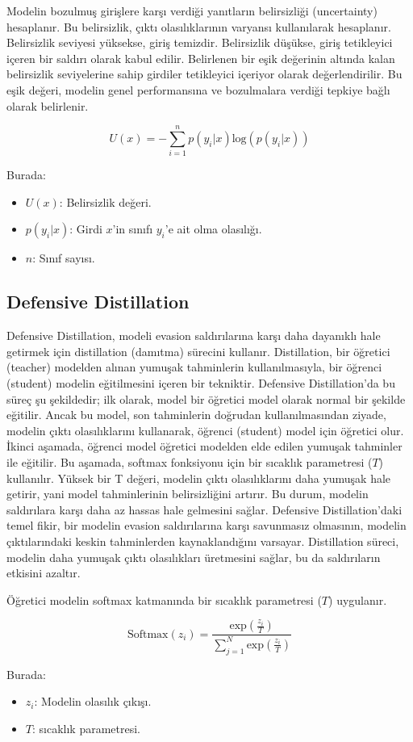 Modelin bozulmuş girişlere karşı verdiği yanıtların belirsizliği (uncertainty) hesaplanır. Bu belirsizlik, çıktı olasılıklarının varyansı kullanılarak hesaplanır. Belirsizlik seviyesi yüksekse, giriş temizdir. Belirsizlik düşükse, giriş tetikleyici içeren bir saldırı olarak kabul edilir. Belirlenen bir eşik değerinin altında kalan belirsizlik seviyelerine sahip girdiler tetikleyici içeriyor olarak değerlendirilir. Bu eşik değeri, modelin genel performansına ve bozulmalara verdiği tepkiye bağlı olarak belirlenir.

\[ U(x) = - \sum_{i=1}^{n} p(y_i | x) \text{log}(p(y_i | x)) \]

Burada:

\begin{itemize}
    \item $U(x)$: Belirsizlik değeri.
    \item $p(y_i | x)$: Girdi $x$'in sınıfı $y_i$'e ait olma olasılığı.
    \item $n$: Sınıf sayısı.
\end{itemize}

\newpage

\subsection{Defensive Distillation}

Defensive Distillation, modeli evasion saldırılarına karşı daha dayanıklı hale getirmek için distillation (damıtma) sürecini kullanır. Distillation, bir öğretici (teacher) modelden alınan yumuşak tahminlerin kullanılmasıyla, bir öğrenci (student) modelin eğitilmesini içeren bir tekniktir. Defensive Distillation'da bu süreç şu şekildedir; ilk olarak, model bir öğretici model olarak normal bir şekilde eğitilir. Ancak bu model, son tahminlerin doğrudan kullanılmasından ziyade, modelin çıktı olasılıklarını kullanarak, öğrenci (student) model için öğretici olur. İkinci aşamada, öğrenci model öğretici modelden elde edilen yumuşak tahminler ile eğitilir. Bu aşamada, softmax fonksiyonu için bir sıcaklık parametresi ($T$) kullanılır. Yüksek bir T değeri, modelin çıktı olasılıklarını daha yumuşak hale getirir, yani model tahminlerinin belirsizliğini artırır. Bu durum, modelin saldırılara karşı daha az hassas hale gelmesini sağlar. Defensive Distillation'daki temel fikir, bir modelin evasion saldırılarına karşı savunmasız olmasının, modelin çıktılarındaki keskin tahminlerden kaynaklandığını varsayar. Distillation süreci, modelin daha yumuşak çıktı olasılıkları üretmesini sağlar, bu da saldırıların etkisini azaltır.

Öğretici modelin softmax katmanında bir sıcaklık parametresi ($T$) uygulanır.

\[ \text{Softmax}(z_i) = \frac{\text{exp}(\frac{z_i}{T})}{\sum_{j=1}^{N} \text{exp}(\frac{z_i}{T})} \]

Burada:

\begin{itemize}
    \item $z_i$: Modelin olasılık çıkışı.
    \item $T$: sıcaklık parametresi.
\end{itemize}

\newpage